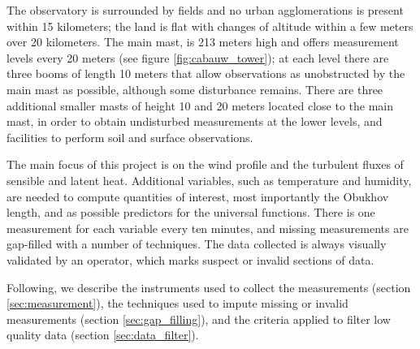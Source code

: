 \documentclass[a4paper,11pt]{kth-mag}
\begin{document}
The observatory is surrounded by fields and no urban agglomerations is present within 15 kilometers; the land is flat with changes of altitude within a few meters over 20 kilometers. The main mast, is 213 meters high and offers measurement levels every 20 meters (see figure \ref{fig:cabauw_tower}); at each level there are three booms of length 10 meters that allow observations as unobstructed by the main mast as possible, although some disturbance remains. There are three additional smaller masts of height 10 and 20 meters located close to the main mast, in order to obtain undisturbed measurements at the lower levels, and facilities to perform soil and surface observations.

The main focus of this project is on the wind profile and the turbulent fluxes of sensible and latent heat. Additional variables, such as temperature and humidity, are needed to compute quantities of interest, most importantly the Obukhov length, and as possible predictors for the universal functions. There is one measurement for each variable every ten minutes, and missing measurements are gap-filled with a number of techniques. The data collected is always visually validated by an operator, which marks suspect or invalid sections of data.

Following, we describe the instruments used to collect the measurements (section \ref{sec:measurement}), the techniques used to impute missing or invalid measurements (section \ref{sec:gap_filling}), and the criteria applied to filter low quality data (section \ref{sec:data_filter}).
\end{document}
